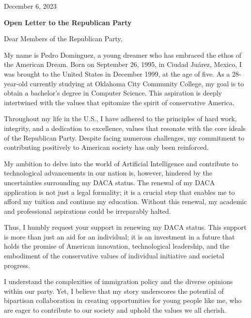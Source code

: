 \documentclass[12pt]{article}
\begin{document}
\hfill December 6, 2023

\vspace{2em}

\begin{center}
\textbf{Open Letter to the Republican Party}
\end{center}

\vspace{1em}

Dear Members of the Republican Party,

\vspace{1em}

My name is Pedro Dominguez, a young dreamer who has embraced the ethos of the American Dream. Born on September 26, 1995, in Ciudad Juárez, Mexico, I was brought to the United States in December 1999, at the age of five. As a 28-year-old currently studying at Oklahoma City Community College, my goal is to obtain a bachelor's degree in Computer Science. This aspiration is deeply intertwined with the values that epitomize the spirit of conservative America.

Throughout my life in the U.S., I have adhered to the principles of hard work, integrity, and a dedication to excellence, values that resonate with the core ideals of the Republican Party. Despite facing numerous challenges, my commitment to contributing positively to American society has only been reinforced.

My ambition to delve into the world of Artificial Intelligence and contribute to technological advancements in our nation is, however, hindered by the uncertainties surrounding my DACA status. The renewal of my DACA application is not just a legal formality; it is a crucial step that enables me to afford my tuition and continue my education. Without this renewal, my academic and professional aspirations could be irreparably halted.

Thus, I humbly request your support in renewing my DACA status. This support is more than just an aid for an individual; it is an investment in a future that holds the promise of American innovation, technological leadership, and the embodiment of the conservative values of individual initiative and societal progress.

I understand the complexities of immigration policy and the diverse opinions within our party. Yet, I believe that my story underscores the potential of bipartisan collaboration in creating opportunities for young people like me, who are eager to contribute to our society and uphold the values we all cherish.
\end{document}
